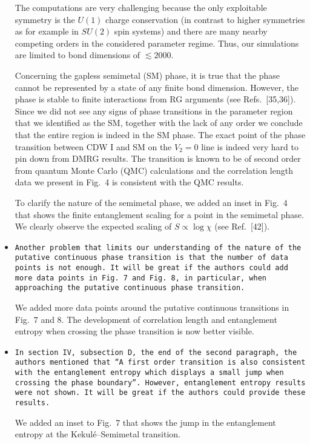 \documentclass[aps,prb,superscriptaddress]{revtex4}
\begin{document}
\begin{itemize}
The computations are very challenging because the only exploitable symmetry is the $U(1)$ charge conservation (in contrast to higher symmetries as for example in $SU(2)$ spin systems) and there are many nearby competing orders in the considered parameter regime. Thus, our simulations are limited to bond dimensions of $\lesssim 2000$.

Concerning the gapless semimetal (SM) phase, it is true that the phase cannot be represented by a state of any finite bond dimension. However, the phase is stable to finite interactions from RG arguments (see Refs.~[35,36]). Since we did not see any signs of phase transitions in the parameter region that we identified as the SM, together with the lack of any order we conclude that the entire region is indeed in the SM phase. The exact point of the phase transition between CDW I and SM on the $V_2=0$ line is indeed very hard to pin down from DMRG results. The transition is known to be of second order from quantum Monte Carlo (QMC) calculations and the correlation length data we present in Fig.~4 is consistent with the QMC results.

To clarify the nature of the semimetal phase, we added an inset in Fig.~4 that shows the finite entanglement scaling for a point in the semimetal phase. We clearly observe the expected scaling of $S \propto \log \chi$ (see Ref.~[42]).



\item{\tt Another problem that limits our understanding of the nature of the
putative continuous phase transition is that the number of data points
is not enough. It will be great if the authors could add more data
points in Fig.~7 and Fig.~8, in particular, when approaching the
putative continuous phase transition.}

We added more data points around the putative continuous transitions in Fig.~7 and 8. The development of correlation length and entanglement entropy when crossing the phase transition is now better visible. 

\item{\tt In section IV, subsection D, the end of the second paragraph, the
authors mentioned that “A first order transition is also consistent
with the entanglement entropy which displays a small jump when
crossing the phase boundary”. However, entanglement entropy results
were not shown. It will be great if the authors could provide these
results.}

We added an inset to Fig.~7 that shows the jump in the entanglement entropy at the Kekul\'e--Semimetal transition.




\end{itemize}
\end{document}
